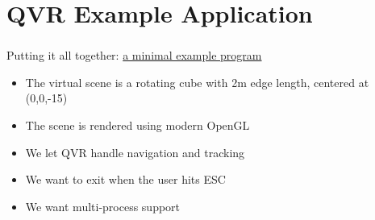 \documentclass[utf8,stillsansserifmath,fleqn,t]{beamer}
\begin{document}
%

\section{QVR Example Application}

\begin{frame}
\frametitle{\insertsection}
Putting it all together:
\href{https://git.marlam.de/gitweb/?p=qvr.git;a=tree;hb=HEAD;f=qvr-example-opengl-minimal}{a minimal example program}
\begin{itemize}
\item The virtual scene is a rotating cube with 2m edge length,
centered at (0,0,-15)
\item The scene is rendered using modern OpenGL
\item We let QVR handle navigation and tracking
\item We want to exit when the user hits ESC
\item We want multi-process support
\end{itemize}
\end{frame}
\end{document}
